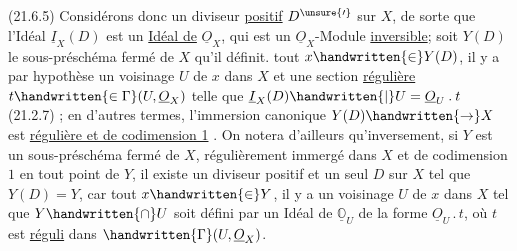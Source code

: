 
(21.6.5) Considérons donc un diviseur \uline{positif} $D^{\unsure{\prime}}$ sur $X$, de sorte que l'Idéal  $\underline I_{X}(D)$ est un \uline{Idéal de} $\underline O_{X}$, qui est un $\underline O_{X}$-Module \uline{inversible}; soit $Y(D)$ le sous-préschéma fermé de $X$ qu'il définit.   tout $x\handwritten{\in}Y(D)$,  il y a par hypothèse un voisinage  $U$ de $x$ dans $X$ et une section \uline{régulière} $t\handwritten{\in\Gamma}(U,\underline O_{X})$ telle que $\underline I_{X}(D)\handwritten{\mid}U=\underline O_{U}\mathbin{.}t$ (21.2.7) ; en d'autres termes, l'immersion canonique $Y(D)\handwritten{\to}X$ est \uline{régulière et de codimension 1} . On notera d'ailleurs qu'inversement, si $Y$ \reversemarginpar
est un sous-préschéma fermé de $X$, régulièrement immergé dans $X$ et  de codimension $1$ en tout point de $Y$, il existe un diviseur positif et un seul  $D$ sur $X$ tel que $Y(D)=Y$, car  tout $x\handwritten{\in}Y$, il y a un voisinage $U$ de $x$ dans $X$ tel que $Y\handwritten{\cap}U$ soit défini par un Idéal de $\underline{\mathbb{O}}_{U}$ de la forme $\underline O_{U}\mathbin{.}t$, où $t$ est \uline{réguli} dans $\handwritten{\Gamma}(U,\underline O_{X})$.



